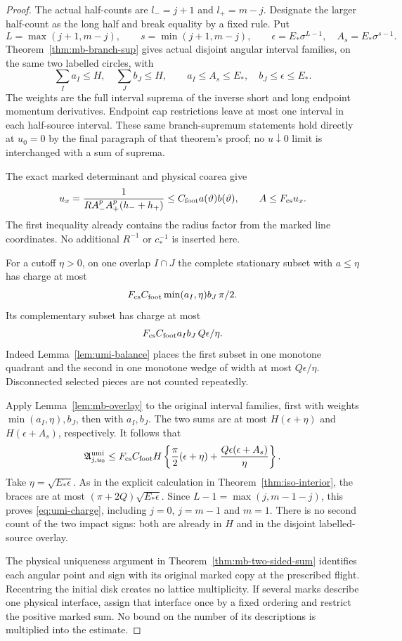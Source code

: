 \begin{proof}
The actual half-counts are
$l_-=j+1$ and $l_+=m-j$. Designate the larger half-count as
the long half and break equality by a fixed rule. Put
\[
 L=\max(j+1,m-j),\qquad s=\min(j+1,m-j),\qquad
 \epsilon=E_*\sigma^{L-1},\quad A_s=E_*\sigma^{s-1}.
\]
Theorem~\ref{thm:mb-branch-sup} gives actual disjoint angular
interval families, on the same two labelled circles, with
\[
 \sum_Ia_I\le H,\quad \sum_Jb_J\le H,\qquad
 a_I\le A_s\le E_*,\quad b_J\le\epsilon\le E_*.
\]
The weights are the full interval suprema of the inverse short
and long endpoint momentum derivatives. Endpoint cap restrictions
leave at most one interval in each half-source interval. These
same branch-supremum statements hold directly at $u_0=0$ by the
final paragraph of that theorem's proof; no $u\downarrow0$ limit
is interchanged with a sum of suprema.

The exact marked determinant and physical coarea give
\[
 u_x=\frac1{R A_-^p A_+^p(h_-+h_+)}
       \le C_{\rm foot}a(\vartheta)b(\vartheta),
 \qquad A\le F_{\rm cs}u_x.
\]
The first inequality already contains the radius factor from
the marked line coordinates. No additional $R^{-1}$ or
$c_*^{-1}$ is inserted here.

For a cutoff $\eta>0$, on one overlap $I\cap J$ the complete
stationary subset with $a\le\eta$ has charge at most
\[
 F_{\rm cs}C_{\rm foot}\min(a_I,\eta)b_J\,\pi/2.
\]
Its complementary subset has charge at most
\[
 F_{\rm cs}C_{\rm foot}a_Ib_J\,Q\epsilon/\eta.
\]
Indeed Lemma~\ref{lem:umi-balance} places the first subset in
one monotone quadrant and the second in one monotone wedge of
width at most $Q\epsilon/\eta$. Disconnected selected pieces
are not counted repeatedly.

Apply Lemma~\ref{lem:mb-overlay} to the original interval
families, first with weights $\min(a_I,\eta),b_J$, then with
$a_I,b_J$. The two sums are at most
$H(\epsilon+\eta)$ and $H(\epsilon+A_s)$, respectively.
It follows that
\[
 \mathfrak A^{\rm umi}_{j,u_0}
 \le F_{\rm cs}C_{\rm foot}H
 \left\{\frac\pi2(\epsilon+\eta)
           +\frac{Q\epsilon(\epsilon+A_s)}\eta\right\}.
\]
Take $\eta=\sqrt{E_*\epsilon}$. As in the explicit calculation
in Theorem~\ref{thm:iso-interior}, the braces are at most
$(\pi+2Q)\sqrt{E_*\epsilon}$.
Since $L-1=\max(j,m-1-j)$, this proves
\eqref{eq:umi-charge}, including $j=0$, $j=m-1$ and $m=1$.
There is no second count of the two impact signs: both are
already in $H$ and in the disjoint labelled-source overlay.

The physical uniqueness argument in
Theorem~\ref{thm:mb-two-sided-sum} identifies each angular point
and sign with its original marked copy at the prescribed flight.
Recentring the initial disk creates no lattice multiplicity.
If several marks describe one physical interface, assign that
interface once by a fixed ordering and restrict the positive
marked sum. No bound on the number of its descriptions is
multiplied into the estimate.


\end{proof}
